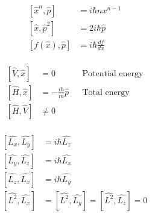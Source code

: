 
\begin{align*}
    \left[\widehat{x}^n,\widehat{p}\right]  & = i \hbar n x^{n-1}    \\
    \left[\widehat{x},\widehat{p}^2\right]  & = 2i\hbar\widehat{p}   \\
    \left[f(\widehat{x}),\widehat{p}\right] & = i \hbar\frac{df}{dx} \\
\end{align*}

\begin{align*}
    \left[\widehat{V},\widehat{x}\right]  & =0                            &  & \text{Potential energy} \\
    \left[\widehat{H},\widehat{x}\right]  & =-\frac{i\hbar}{m}\widehat{p} &  & \text{Total energy}     \\
    \left[\widehat{H}, \widehat{V}\right] & \neq 0                                                     \\
\end{align*}


\begin{align*}
    \left[\widehat{L_{x}},\widehat{L_{y}}\right] & =i\hbar \widehat{L_{z}}                                                                           \\
    \left[\widehat{L_{y}},\widehat{L_{z}}\right] & =i\hbar \widehat{L_{x}}                                                                           \\
    \left[\widehat{L_{z}},\widehat{L_{x}}\right] & =i\hbar \widehat{L_{y}}                                                                           \\
    \left[\widehat{L^{2}},\widehat{L_{x}}\right] & = \left[\widehat{L^{2}},\widehat{L_{y}}\right] = \left[\widehat{L^{2}},\widehat{L_{z}}\right] = 0
\end{align*}

